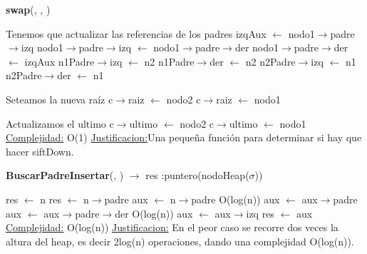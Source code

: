 \begin{Representacion}
\begin{Algoritmos}
\begin{algorithm}[H]{\textbf{swap}(, , )}
\begin{algorithmic}[1]
\begin{scriptsize}
				\Comment Tenemos que actualizar las referencias de los padres
					\State izqAux $\gets$ nodo1$\to$padre$\to$izq
					\State nodo1$\to$padre$\to$izq $\gets$ nodo1$\to$padre$\to$der
					\State nodo1$\to$padre$\to$der $\gets$ izqAux
				\Else
						\State n1Padre$\to$izq $\gets$ n2
					\EndIf
						\State n1Padre$\to$der $\gets$ n2
					\EndIf
						\State n2Padre$\to$izq $\gets$ n1
					\EndIf
						\State n2Padre$\to$der $\gets$ n1
					\EndIf				
				\EndIf
			\EndIf
			
			\Comment Seteamos la nueva raíz
				\State c$\to$raiz $\gets$ nodo2			
			\Else
					\State c$\to$raiz $\gets$ nodo1
				\EndIf			
			\EndIf
			
			\Comment Actualizamos el ultimo
				\State c$\to$ultimo $\gets$ nodo2
			\Else
					\State c$\to$ultimo $\gets$ nodo1			
				\EndIf
			\EndIf
		\EndIf
		\medskip
		\Statex \underline{Complejidad:} O(1)
			\Statex \underline{Justificacion:}Una pequeña función para determinar si hay que hacer siftDown. 
	\end{scriptsize}
	\end{algorithmic}
\end{algorithm}


\begin{algorithm}[H]{\textbf{BuscarPadreInsertar}(, ) $\to$ res :{puntero(nodoHeap($\sigma$))} }
	\begin{algorithmic}[1]
	
			\State res $\gets$ n
		\Else
				\State res $\gets$ n$\to$padre			
			\Else
				\State aux $\gets$ n$\to$padre
					 \Comment O(log(n))
					\State aux $\gets$ aux$\to$padre
				\EndWhile
					\State aux $\gets$ aux$\to$padre$\to$der
				\EndIf
						\Comment O(log(n))
					\State aux $\gets$ aux$\to$izq
				\EndWhile
				\State res $\gets$ aux
			\EndIf
		\EndIf
		\medskip
		\Statex \underline{Complejidad:} O(log(n))
			\Statex \underline{Justificacion:} En el peor caso se recorre dos veces la altura del heap, es decir 2log(n) operaciones, dando una complejidad O(log(n)). 
	\end{algorithmic}
\end{algorithm}


\end{Algoritmos}
\end{Representacion}
